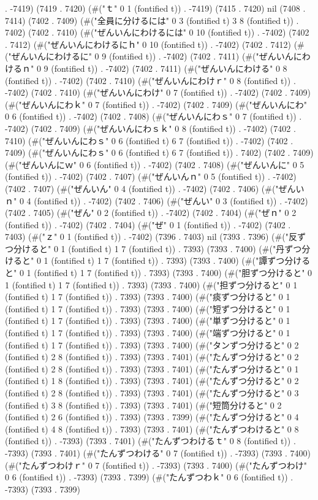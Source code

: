 . -7419) (7419 . 7420) (#("ｔ" 0 1 (fontified t)) . -7419) (7415 . 7420) nil (7408 . 7414) (7402 . 7409) (#("全員に分けるには" 0 3 (fontified t) 3 8 (fontified t)) . 7402) (7402 . 7410) (#("ぜんいんにわけるには" 0 10 (fontified t)) . -7402) (7402 . 7412) (#("ぜんいんにわけるにｈ" 0 10 (fontified t)) . -7402) (7402 . 7412) (#("ぜんいんにわけるに" 0 9 (fontified t)) . -7402) (7402 . 7411) (#("ぜんいんにわけるｎ" 0 9 (fontified t)) . -7402) (7402 . 7411) (#("ぜんいんにわける" 0 8 (fontified t)) . -7402) (7402 . 7410) (#("ぜんいんにわけｒ" 0 8 (fontified t)) . -7402) (7402 . 7410) (#("ぜんいんにわけ" 0 7 (fontified t)) . -7402) (7402 . 7409) (#("ぜんいんにわｋ" 0 7 (fontified t)) . -7402) (7402 . 7409) (#("ぜんいんにわ" 0 6 (fontified t)) . -7402) (7402 . 7408) (#("ぜんいんにわｓ" 0 7 (fontified t)) . -7402) (7402 . 7409) (#("ぜんいんにわｓｋ" 0 8 (fontified t)) . -7402) (7402 . 7410) (#("ぜんいんにわｓ" 0 6 (fontified t) 6 7 (fontified t)) . -7402) (7402 . 7409) (#("ぜんいんにわｓ" 0 6 (fontified t) 6 7 (fontified t)) . 7402) (7402 . 7409) (#("ぜんいんにｗ" 0 6 (fontified t)) . -7402) (7402 . 7408) (#("ぜんいんに" 0 5 (fontified t)) . -7402) (7402 . 7407) (#("ぜんいんｎ" 0 5 (fontified t)) . -7402) (7402 . 7407) (#("ぜんいん" 0 4 (fontified t)) . -7402) (7402 . 7406) (#("ぜんいｎ" 0 4 (fontified t)) . -7402) (7402 . 7406) (#("ぜんい" 0 3 (fontified t)) . -7402) (7402 . 7405) (#("ぜん" 0 2 (fontified t)) . -7402) (7402 . 7404) (#("ぜｎ" 0 2 (fontified t)) . -7402) (7402 . 7404) (#("ぜ" 0 1 (fontified t)) . -7402) (7402 . 7403) (#("ｚ" 0 1 (fontified t)) . -7402) (7396 . 7403) nil (7393 . 7396) (#("反ずつ分けると" 0 1 (fontified t) 1 7 (fontified t)) . 7393) (7393 . 7400) (#("丹ずつ分けると" 0 1 (fontified t) 1 7 (fontified t)) . 7393) (7393 . 7400) (#("譚ずつ分けると" 0 1 (fontified t) 1 7 (fontified t)) . 7393) (7393 . 7400) (#("胆ずつ分けると" 0 1 (fontified t) 1 7 (fontified t)) . 7393) (7393 . 7400) (#("担ずつ分けると" 0 1 (fontified t) 1 7 (fontified t)) . 7393) (7393 . 7400) (#("痰ずつ分けると" 0 1 (fontified t) 1 7 (fontified t)) . 7393) (7393 . 7400) (#("短ずつ分けると" 0 1 (fontified t) 1 7 (fontified t)) . 7393) (7393 . 7400) (#("単ずつ分けると" 0 1 (fontified t) 1 7 (fontified t)) . 7393) (7393 . 7400) (#("端ずつ分けると" 0 1 (fontified t) 1 7 (fontified t)) . 7393) (7393 . 7400) (#("タンずつ分けると" 0 2 (fontified t) 2 8 (fontified t)) . 7393) (7393 . 7401) (#("たんずつ分けると" 0 2 (fontified t) 2 8 (fontified t)) . 7393) (7393 . 7401) (#("たんずつ分けると" 0 1 (fontified t) 1 8 (fontified t)) . 7393) (7393 . 7401) (#("たんずつ分けると" 0 2 (fontified t) 2 8 (fontified t)) . 7393) (7393 . 7401) (#("たんずつ分けると" 0 3 (fontified t) 3 8 (fontified t)) . 7393) (7393 . 7401) (#("短筒分けると" 0 2 (fontified t) 2 6 (fontified t)) . 7393) (7393 . 7399) (#("たんずつ分けると" 0 4 (fontified t) 4 8 (fontified t)) . 7393) (7393 . 7401) (#("たんずつわけると" 0 8 (fontified t)) . -7393) (7393 . 7401) (#("たんずつわけるｔ" 0 8 (fontified t)) . -7393) (7393 . 7401) (#("たんずつわける" 0 7 (fontified t)) . -7393) (7393 . 7400) (#("たんずつわけｒ" 0 7 (fontified t)) . -7393) (7393 . 7400) (#("たんずつわけ" 0 6 (fontified t)) . -7393) (7393 . 7399) (#("たんずつわｋ" 0 6 (fontified t)) . -7393) (7393 . 7399) 
